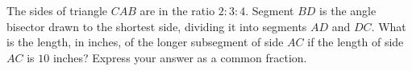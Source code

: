 The sides of triangle $CAB$ are in the ratio $2:3:4$. Segment $BD$ is the angle bisector drawn to the shortest side, dividing it into segments $AD$ and $DC$. What is the length, in inches, of the longer subsegment of side $AC$ if the length of side $AC$ is $10$ inches? Express your answer as a common fraction.
